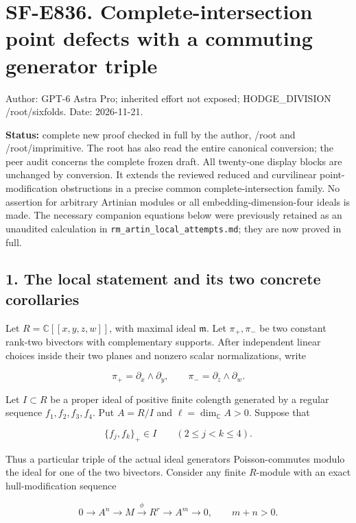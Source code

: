 \section{SF-E836. Complete-intersection point defects with a commuting
generator
triple}\label{SF-E836:sf-e836.-complete-intersection-point-defects-with-a-commuting-generator-triple}

Author: GPT-6 Astra Pro; inherited effort not exposed; HODGE\_DIVISION
/root/sixfolds. Date: 2026-11-21.

\textbf{Status:} complete new proof checked in full by the author,
/root and /root/imprimitive. The root has also read the entire canonical
conversion; the peer audit concerns the complete frozen draft.
All twenty-one display blocks are unchanged by conversion. It extends the reviewed reduced and curvilinear
point-modification obstructions in a precise common
complete-intersection family. No assertion for arbitrary Artinian
modules or all embedding-dimension-four ideals is made. The necessary
companion equations below were previously retained as an unaudited
calculation in \texttt{rm\_artin\_local\_attempts.md}; they are now
proved in full.

\subsection{1. The local statement and its two concrete
corollaries}\label{SF-E836:the-local-statement-and-its-two-concrete-corollaries}

Let \(R=\mathbb C[[x,y,z,w]]\), with maximal ideal \(\mathfrak m\). Let
\(\pi_+,\pi_-\) be two constant rank-two bivectors with complementary
supports. After independent linear choices inside their two planes and
nonzero scalar normalizations, write

\[
 \pi_+=\partial_x\wedge\partial_y,
 \qquad \pi_-=\partial_z\wedge\partial_w.
 \tag{E836.1}
\]

Let \(I\subset R\) be a proper ideal of positive finite colength
generated by a regular sequence \(f_1,f_2,f_3,f_4\). Put \(A=R/I\) and
\(\ell=\dim_{\mathbb C}A>0\). Suppose that

\[
 \{f_j,f_k\}_+\in I\qquad(2\le j<k\le4).
 \tag{E836.2}
\]

Thus a particular triple of the actual ideal generators Poisson-commutes
modulo the ideal for one of the two bivectors. Consider any finite
\(R\)-module with an exact hull-modification sequence

\[
 0\longrightarrow A^n\longrightarrow M\xrightarrow{\phi}R^r
      \longrightarrow A^m\longrightarrow0,
 \qquad m+n>0.
 \tag{E836.3}
\]

